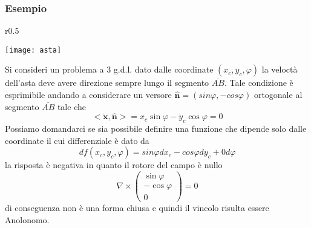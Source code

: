 \subsubsection{Esempio}
\begin{wrapfigure}{r}{0.5\textwidth}
  \begin{center}
    \texttt{[image: asta]}
  \end{center}
\end{wrapfigure}
Si consideri un problema a 3 g.d.l. dato dalle coordinate $(x_c,y_c,\varphi)$ la veloct\`{a} dell'asta deve avere direzione sempre lungo il segmento $\overline{AB}$. Tale condizione  \`{e} esprimibile andando a considerare un versore $\hat{\bm{n}} = (sin\varphi, - cos\varphi)$ ortogonale al segmento $\overline{AB}$ tale che 
\begin{equation*}
	<\bm{\dot{x}},\hat{\bm{n}}> = 
x_c \sin \varphi-\dot{y}_c \cos \varphi=0 
\end{equation*}
Possiamo domandarci se sia possibile definire una funzione che dipende solo dalle coordinate il cui differenziale \`{e} dato da 
\begin{equation*}
	df(x_{c},y_{c},\varphi) = sin\varphi dx_c - cos\varphi dy_c + 0 d\varphi
\end{equation*}
la risposta \`{e} negativa in quanto il rotore del campo \`{e} nullo
\begin{equation*}
\nabla \times 
\left(\begin{array}{c}
\sin \varphi \\
-\cos \varphi \\
0
\end{array}\right) = 0
\end{equation*} 
di conseguenza non \`{e} una forma chiusa e quindi il vincolo risulta essere Anolonomo.

